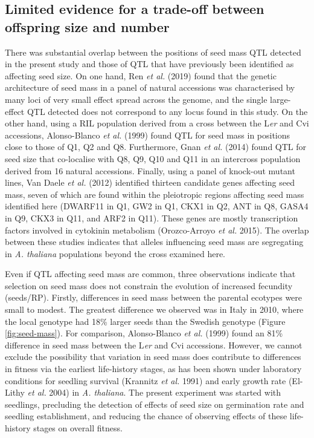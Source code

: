 \documentclass[]{article}
\begin{document}
\hypertarget{limited-evidence-for-a-trade-off-between-offspring-size-and-number}{%
\subsection{Limited evidence for a trade-off between offspring size and number}\label{limited-evidence-for-a-trade-off-between-offspring-size-and-number}}

There was substantial overlap between the positions of seed mass QTL detected in the present study and those of QTL that have previously been identified as affecting seed size. On one hand, Ren \emph{et al.} (2019) found that the genetic architecture of seed mass in a panel of natural accessions was characterised by many loci of very small effect spread across the genome, and the single large-effect QTL detected does not correspond to any locus found in this study. On the other hand, using a RIL population derived from a cross between the L\emph{er} and Cvi accessions, Alonso-Blanco \emph{et al.} (1999) found QTL for seed mass in positions close to those of Q1, Q2 and Q8. Furthermore, Gnan \emph{et al.} (2014) found QTL for seed size that co-localise with Q8, Q9, Q10 and Q11 in an intercross population derived from 16 natural accessions. Finally, using a panel of knock-out mutant lines, Van Daele \emph{et al.} (2012) identified thirteen candidate genes affecting seed mass, seven of which are found within the pleiotropic regions affecting seed mass identified here (DWARF11 in Q1, GW2 in Q1, CKX1 in Q2, ANT in Q8, GASA4 in Q9, CKX3 in Q11, and ARF2 in Q11). These genes are mostly transcription factors involved in cytokinin metabolism (Orozco-Arroyo \emph{et al.} 2015). The overlap between these studies indicates that alleles influencing seed mass are segregating in \emph{A. thaliana} populations beyond the cross examined here.

Even if QTL affecting seed mass are common, three observations indicate that selection on seed mass does not constrain the evolution of increased fecundity (seeds/RP). Firstly, differences in seed mass between the parental ecotypes were small to modest. The greatest difference we observed was in Italy in 2010, where the local genotype had 18\% larger seeds than the Swedish genotype (Figure \ref{fig:seed-mass}). For comparison, Alonso-Blanco \emph{et al.} (1999) found an 81\% difference in seed mass between the L\emph{er} and Cvi accessions. However, we cannot exclude the possibility that variation in seed mass does contribute to differences in fitness via the earliest life-history stages, as has been shown under laboratory conditions for seedling survival (Krannitz \emph{et al.} 1991) and early growth rate (El-Lithy \emph{et al.} 2004) in \emph{A. thaliana}. The present experiment was started with seedlings, precluding the detection of effects of seed size on germination rate and seedling establishment, and reducing the chance of observing effects of these life-history stages on overall fitness.
\end{document}
